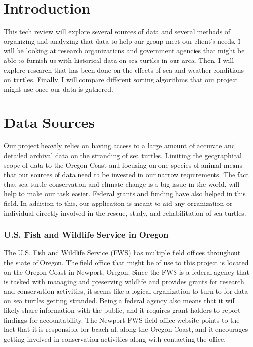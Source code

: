 \documentclass[onecolumn, draftclsnofoot,10pt, compsoc]{IEEEtran}
\begin{document}
\begin{singlespace}
\section{Introduction}
This tech review will explore several sources of data and several methods of organizing and
analyzing that data to help our group meet our client's needs. I will be looking at research
organizations and government agencies that might be able to furnish us with historical data
on sea turtles in our area. Then, I will explore research that has been done on the effects of
sea and weather conditions on turtles. Finally, I will compare different sorting algorithms
that our project might use once our data is gathered.
\section{Data Sources}
Our project heavily relies on having access to a large amount of accurate and detailed
archival data on the stranding of sea turtles. Limiting the geographical scope of data to
the Oregon Coast and focusing on one species of animal means that our sources of data
need to be invested in our narrow requirements. The fact that sea turtle conservation and
climate change is a big issue in the world, will help to make our task easier. Federal
grants and funding have also helped in this field. In addition to this, our application is
meant to aid any organization or individual directly involved in the rescue, study, and
rehabilitation of sea turtles.
\subsubsection{U.S. Fish and Wildlife Service in Oregon}
The U.S. Fish and Wildlife Service (FWS) has multiple field offices throughout the state
of Oregon. The field office that might be of use to this project is located on the Oregon
Coast in Newport, Oregon. Since the FWS is a federal agency that is tasked with
managing and preserving wildlife and provides grants for research and conservation
activities, it seems like a logical organization to turn to for data on sea turtles getting stranded.
Being a federal agency also means that it will likely share information with the public,
and it requires grant holders to report findings for accountability. The Newport FWS
field office website points to the fact that it is responsible for beach all along the Oregon
Coast, and it encourages getting involved in conservation activities along with
contacting the office. \cite{ofwo}

\end{singlespace}
\end{document}

